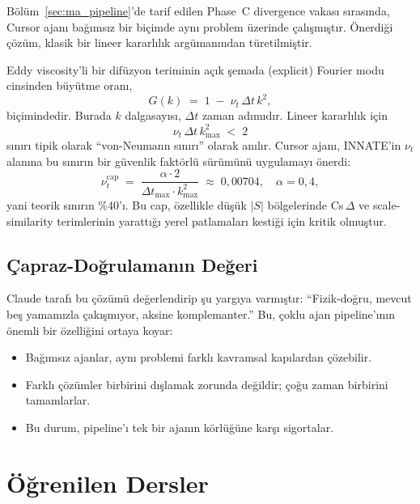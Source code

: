 Bölüm~\ref{sec:ma_pipeline}'de tarif edilen Phase~C divergence vakası
sırasında, Cursor ajanı bağımsız bir biçimde aynı problem üzerinde
çalışmıştır. Önerdiği çözüm, klasik bir lineer kararlılık
argümanından türetilmiştir.

Eddy viscosity'li bir difüzyon teriminin açık şemada (explicit) Fourier
modu cinsinden büyütme oranı,
\begin{equation}
G(k) \;=\; 1 \;-\; \nu_t \, \Delta t \, k^2,
\end{equation}
biçimindedir. Burada $k$ dalgasayısı, $\Delta t$ zaman adımıdır.
Lineer kararlılık için
\begin{equation}
\nu_t \, \Delta t \, k_{\max}^2 \;<\; 2
\label{eq:ma_vn}
\end{equation}
sınırı tipik olarak ``von-Neumann sınırı'' olarak anılır. Cursor
ajanı, INNATE'in $\nu_t$ alanına bu sınırın bir güvenlik faktörlü
sürümünü uygulamayı önerdi:
\begin{equation}
\nu_t^{\mathrm{cap}}
\;=\; \frac{\alpha \cdot 2}{\Delta t_{\max} \cdot k_{\max}^2}
\;\approx\; 0{,}00704,
\quad \alpha = 0{,}4,
\end{equation}
yani teorik sınırın \%40'ı. Bu cap, özellikle düşük $|S|$
bölgelerinde Cs$\,\Delta$ ve scale-similarity terimlerinin yarattığı
yerel patlamaları kestiği için kritik olmuştur.

\subsection{Çapraz-Doğrulamanın Değeri}

Claude tarafı bu çözümü değerlendirip şu yargıya varmıştır:
``Fizik-doğru, mevcut beş yamamızla çakışmıyor, aksine
komplemanter.'' Bu, çoklu ajan pipeline'ının önemli bir özelliğini
ortaya koyar:

\begin{itemize}
  \item Bağımsız ajanlar, aynı problemi farklı kavramsal kapılardan
        çözebilir.
  \item Farklı çözümler birbirini dışlamak zorunda değildir; çoğu
        zaman birbirini tamamlarlar.
  \item Bu durum, pipeline'ı tek bir ajanın körlüğüne karşı sigortalar.
\end{itemize}

\section{Öğrenilen Dersler}
\label{sec:ma_dersler}

